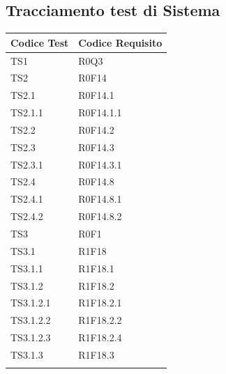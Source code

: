 \documentclass[../PianoDiQualifica.tex]{subfiles}
\begin{document}
	\subsection{Tracciamento test di Sistema}
	\begin{longtabu} to \textwidth {
			X[4,l,p]
			X[8,l,p]}
		\toprule
		 Codice Test & Codice Requisito \\
		\midrule
		\endhead
		\midrule
		\addlinespace[0.2em]
		TS1 & R0Q3 \\
		\addlinespace[0.2em]
		\midrule
		\addlinespace[0.2em]
		TS2 & R0F14 \\
		\addlinespace[0.2em]
		\midrule
		\addlinespace[0.2em]
		TS2.1 & R0F14.1 \\
		\addlinespace[0.2em]
		\midrule
		\addlinespace[0.2em]
		TS2.1.1 & R0F14.1.1 \\
		\addlinespace[0.2em]
		\midrule
		\addlinespace[0.2em]
		TS2.2 & R0F14.2 \\
		\addlinespace[0.2em]
		\midrule
		\addlinespace[0.2em]
		TS2.3 & R0F14.3 \\
		\addlinespace[0.2em]
		\midrule
		\addlinespace[0.2em]
		TS2.3.1 & R0F14.3.1 \\
		\addlinespace[0.2em]
		\midrule
		\addlinespace[0.2em]
		TS2.4 & R0F14.8 \\
		\addlinespace[0.2em]
		\midrule
		\addlinespace[0.2em]
		TS2.4.1 & R0F14.8.1 \\
		\addlinespace[0.2em]
		\midrule
		\addlinespace[0.2em]
		TS2.4.2 & R0F14.8.2 \\
		\addlinespace[0.2em]
		\midrule
		\addlinespace[0.2em]
		TS3 & R0F1 \\
		\addlinespace[0.2em]
		\midrule
		\addlinespace[0.2em]
		TS3.1 & R1F18 \\
		\addlinespace[0.2em]
		\midrule
		\addlinespace[0.2em]
		TS3.1.1 & R1F18.1 \\
		\addlinespace[0.2em]
		\midrule
		\addlinespace[0.2em]
		TS3.1.2 & R1F18.2 \\
		\addlinespace[0.2em]
		\midrule
		\addlinespace[0.2em]
		TS3.1.2.1 & R1F18.2.1 \\
		\addlinespace[0.2em]
		\midrule
		\addlinespace[0.2em]
		TS3.1.2.2 & R1F18.2.2 \\
		\addlinespace[0.2em]
		\midrule
		\addlinespace[0.2em]
		TS3.1.2.3 & R1F18.2.4 \\
		\addlinespace[0.2em]
		\midrule
		\addlinespace[0.2em]
		TS3.1.3 & R1F18.3 \\
		\addlinespace[0.2em]

\end{longtabu}
\end{document}
